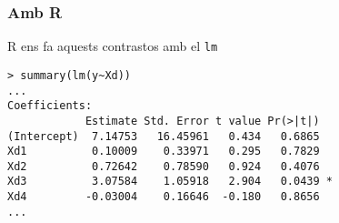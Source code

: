 \documentclass[12pt,t]{beamer}
\renewcommand{\geq}{\geqslant}
\theoremstyle{plain}
\theoremstyle{definition}
\begin{document}
\begin{frame}[fragile]
\frametitle{Amb R}
R ens fa aquests contrastos amb el \texttt{lm}
\medskip

{\footnotesize
\begin{verbatim}
> summary(lm(y~Xd))
...
Coefficients:
            Estimate Std. Error t value Pr(>|t|)  
(Intercept)  7.14753   16.45961   0.434   0.6865  
Xd1          0.10009    0.33971   0.295   0.7829  
Xd2          0.72642    0.78590   0.924   0.4076  
Xd3          3.07584    1.05918   2.904   0.0439 *
Xd4         -0.03004    0.16646  -0.180   0.8656  
...
\end{verbatim}
}
\end{frame}




%
%
%
%
%
%
%
%
%
%
%
%
\end{document}

